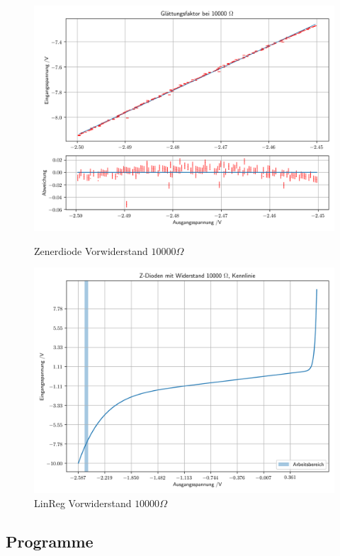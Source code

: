 \documentclass[12pt,twoside,a4paper]{scrartcl}
\begin{document}
		\begin{figure}[H]
			\centering
			\begin{minipage}{0.49 \textwidth}
					\includegraphics[width = \textwidth]{Plots/zener/diff_res_10000}
			\caption{Zenerdiode Vorwiderstand $10000 \Omega$}
			\end{minipage}
			\begin{minipage}{0.49 \textwidth}
					\includegraphics[width = \textwidth]{Plots/zener/spannungenZener_10000}
			\caption{LinReg Vorwiderstand $10000 \Omega$}
			\end{minipage}
		\end{figure}

\newpage
	\subsection{Programme}
\end{document}
